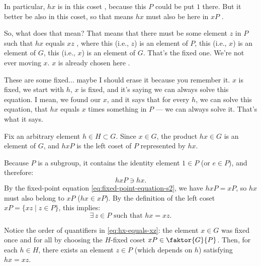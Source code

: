\begin{proofWrapper}
\begin{speech}[00:30:35 - 00:32:09]
In particular, $h x$ is in this coset , because this $P$ could be put $1$ there. But it better be also in this coset, so that means $h x$ must also be here in $x P$ .

So, what does that mean? That means that there must be some element $z$ in $P$ such that $h x$ equals $x z$ , where this (i.e., $z$) is an element of $P$, this (i.e., $x$) is an element of $G$, this (i.e., $x$) is an element of $G$. That's the fixed one. We're not ever moving $x$. $x$ is already chosen here .

These are some fixed... maybe I should erase it because you remember it. $x$ is fixed, we start with $h$, $x$ is fixed, and it's saying we can always solve this equation. I mean, we found our $x$, and it says that for every $h$, we can solve this equation, that $h x$ equals $x$ times something in $P$ --- we can always solve it. That's what it says.
\end{speech}

\begin{content}
Fix an arbitrary element $h \in H \subset G$. Since $x \in G$, the product $h x \in G$ is an element of $G$, and $h x P$ is the left coset of $P$ represented by $h x$.

Because $P$ is a subgroup, it contains the identity element $1 \in P$ (or $e \in P$), and therefore:
\[
h x P \ni h x.
\]
By the fixed-point equation \eqref{eq:fixed-point-equation-s2}, we have $h x P = x P$, so $h x$ must also belong to $x P$ ($h x \in x P$). By the definition of the left coset $x P = \{ x z \mid z \in P \}$, this implies:
\begin{equation}\label{eq:hx-equals-xz}
\exists\, z \in P \text{ such that } h x = x z.
\end{equation}

\begin{steps}
Notice the order of quantifiers in \eqref{eq:hx-equals-xz}: the element $x \in G$ was fixed once and for all by choosing the $H$-fixed coset $x P \in \faktor{G}{P}$. Then, for each $h \in H$, there exists an element $z \in P$ (which depends on $h$) satisfying $h x = x z$.
\end{steps}
\end{content}


\end{proofWrapper}
